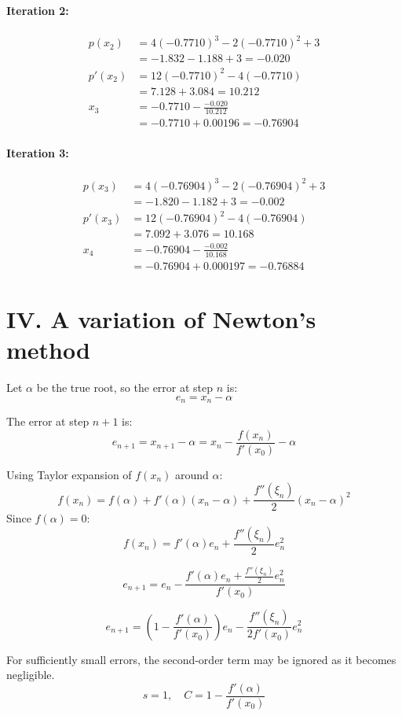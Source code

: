 \documentclass[a4paper]{article}
\begin{document}
\paragraph*{Iteration 2:}
\begin{align*}
p(x_2) &= 4(-0.7710)^3 - 2(-0.7710)^2 + 3 \\
&= -1.832 - 1.188 + 3 = -0.020 \\
p'(x_2) &= 12(-0.7710)^2 - 4(-0.7710) \\
&= 7.128 + 3.084 = 10.212 \\
x_3 &= -0.7710 - \frac{-0.020}{10.212} \\
&= -0.7710 + 0.00196 = -0.76904
\end{align*}

\paragraph*{Iteration 3:}
\begin{align*}
p(x_3) &= 4(-0.76904)^3 - 2(-0.76904)^2 + 3 \\
&= -1.820 - 1.182 + 3 = -0.002 \\
p'(x_3) &= 12(-0.76904)^2 - 4(-0.76904) \\
&= 7.092 + 3.076 = 10.168 \\
x_4 &= -0.76904 - \frac{-0.002}{10.168} \\
&= -0.76904 + 0.000197 = -0.76884
\end{align*}

\section*{IV. A variation of Newton’s method}

Let \( \alpha \) be the true root, so the error at step \( n \) is:
\[
e_n = x_n - \alpha
\]

The error at step \( n+1 \) is:
\[
e_{n+1} = x_{n+1} - \alpha = x_n - \frac{f(x_n)}{f'(x_0)} - \alpha
\]

Using Taylor expansion of \( f(x_n) \) around \( \alpha \):
\[
f(x_n) = f(\alpha) + f'(\alpha)(x_n - \alpha) + \frac{f''(\xi_n)}{2}(x_n - \alpha)^2
\]
Since \( f(\alpha) = 0 \):
\[
f(x_n) = f'(\alpha)e_n + \frac{f''(\xi_n)}{2}e_n^2
\]

\[
e_{n+1} = e_n - \frac{f'(\alpha)e_n + \frac{f''(\xi_n)}{2}e_n^2}{f'(x_0)}
\]

\[
e_{n+1} = \left(1 - \frac{f'(\alpha)}{f'(x_0)}\right)e_n - \frac{f''(\xi_n)}{2f'(x_0)}e_n^2
\]

For sufficiently small errors, the second-order term may be ignored as it becomes negligible.
\[
s = 1, \quad C = 1 - \frac{f'(\alpha)}{f'(x_0)}
\]
\end{document}
